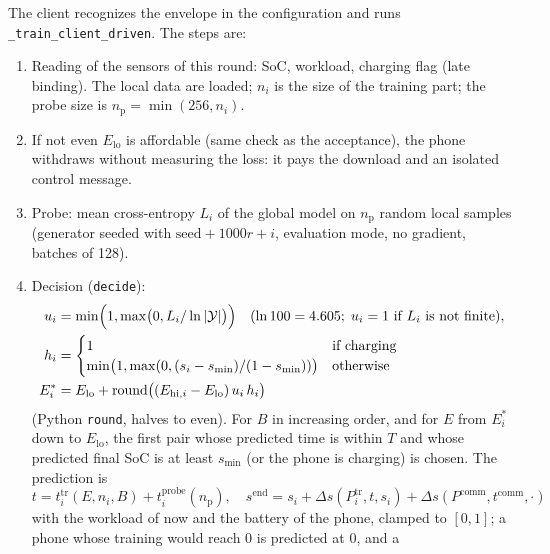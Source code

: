 \documentclass[11pt,a4paper]{article}
\newcommand{\cf}[1]{\texttt{#1}}
\begin{document}
The client recognizes the envelope in the configuration and runs
\cf{\_train\_client\_driven}. The steps are:
\begin{enumerate}
  \item Reading of the sensors of this round: SoC, workload, charging flag
        (late binding). The local data are loaded; $n_i$ is the size of the
        training part; the probe size is $n_{\mathrm{p}} = \min(256, n_i)$.
  \item If not even $E_{\mathrm{lo}}$ is affordable (same check as the
        acceptance), the phone withdraws without measuring the loss: it pays
        the download and an isolated control message.
  \item Probe: mean cross-entropy $L_i$ of the global model on $n_{\mathrm{p}}$
        random local samples (generator seeded with $\text{seed} + 1000 r + i$,
        evaluation mode, no gradient, batches of 128).
  \item Decision (\cf{decide}):
        \begin{align}
          u_i &= \min\Bigl(1, \max\bigl(0, L_i / \ln |\mathcal{Y}|\bigr)\Bigr)
               \quad (\ln 100 = 4.605;\; u_i = 1 \text{ if } L_i \text{ is not finite}), \\
          h_i &= \begin{cases} 1 & \text{if charging} \\
                 \min\bigl(1, \max(0, (s_i - s_{\min}) / (1 - s_{\min}))\bigr) & \text{otherwise} \end{cases} \\
          E^{*}_i &= E_{\mathrm{lo}} + \operatorname{round}\bigl((E_{\mathrm{hi},i} - E_{\mathrm{lo}})\, u_i \, h_i\bigr)
        \end{align}
        (Python \cf{round}, halves to even). For $B$ in increasing order, and
        for $E$ from $E^{*}_i$ down to $E_{\mathrm{lo}}$, the first pair whose
        predicted time is within $T$ and whose predicted final SoC is at least
        $s_{\min}$ (or the phone is charging) is chosen. The prediction is
        \begin{equation}
          t = t^{\mathrm{tr}}_i(E, n_i, B) + t^{\mathrm{probe}}_i(n_{\mathrm{p}}), \quad
          s^{\mathrm{end}} = s_i + \Delta s(P^{\mathrm{tr}}_i, t, s_i) + \Delta s(P^{\mathrm{comm}}, t^{\mathrm{comm}}, \cdot)
          \label{eq:predict}
        \end{equation}
        with the workload of now and the battery of the phone, clamped to
        $[0, 1]$; a phone whose training would reach 0 is predicted at 0, and a

\end{enumerate}
\end{document}
